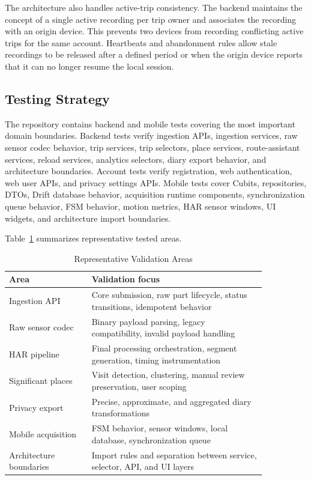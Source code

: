 \documentclass[conference,a4paper]{IEEEtran}
\begin{document}
The architecture also handles active-trip consistency. The backend maintains the concept of a single active recording per trip owner and associates the recording with an origin device. This prevents two devices from recording conflicting active trips for the same account. Heartbeats and abandonment rules allow stale recordings to be released after a defined period or when the origin device reports that it can no longer resume the local session.

\subsection{Testing Strategy}

The repository contains backend and mobile tests covering the most important domain boundaries. Backend tests verify ingestion APIs, ingestion services, raw sensor codec behavior, trip services, trip selectors, place services, route-assistant services, reload services, analytics selectors, diary export behavior, and architecture boundaries. Account tests verify registration, web authentication, web user APIs, and privacy settings APIs. Mobile tests cover Cubits, repositories, DTOs, Drift database behavior, acquisition runtime components, synchronization queue behavior, FSM behavior, motion metrics, HAR sensor windows, UI widgets, and architecture import boundaries.

Table~\ref{tab:tests} summarizes representative tested areas.

\begin{table}[htbp]
\caption{Representative Validation Areas}
\begin{center}
\begin{tabular}{p{0.27\linewidth} p{0.58\linewidth}}
\toprule
\textbf{Area} & \textbf{Validation focus}\\
\midrule
Ingestion API & Core submission, raw part lifecycle, status transitions, idempotent behavior\\
Raw sensor codec & Binary payload parsing, legacy compatibility, invalid payload handling\\
HAR pipeline & Final processing orchestration, segment generation, timing instrumentation\\
Significant places & Visit detection, clustering, manual review preservation, user scoping\\
Privacy export & Precise, approximate, and aggregated diary transformations\\
Mobile acquisition & FSM behavior, sensor windows, local database, synchronization queue\\
Architecture boundaries & Import rules and separation between service, selector, API, and UI layers\\
\bottomrule
\end{tabular}
\label{tab:tests}
\end{center}
\end{table}
\end{document}
